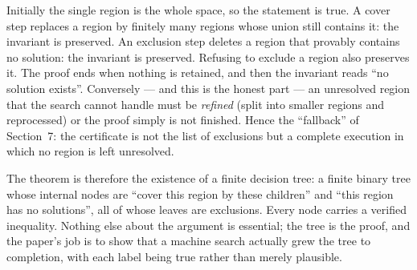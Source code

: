 \documentclass[11pt]{article}
\theoremstyle{definition}
\theoremstyle{plain}
\theoremstyle{definition}
\begin{document}
Initially the single region is the whole space, so the statement is true. A cover step replaces a
region by finitely many regions whose union still contains it: the invariant is preserved. An
exclusion step deletes a region that provably contains no solution: the invariant is preserved.
Refusing to exclude a region also preserves it. The proof ends when nothing is retained, and then
the invariant reads ``no solution exists''. Conversely --- and this is the honest part --- an
unresolved region that the search cannot handle must be \emph{refined} (split into smaller regions
and reprocessed) or the proof simply is not finished. Hence the ``fallback'' of Section~7: the
certificate is not the list of exclusions but a complete execution in which no region is left
unresolved.

\begin{ideabox}
The theorem is therefore the existence of a finite decision tree: a finite binary tree whose
internal nodes are ``cover this region by these children'' and ``this region has no solutions'', all
of whose leaves are exclusions. Every node carries a verified inequality. Nothing else about the
argument is essential; the tree is the proof, and the paper's job is to show that a machine search
actually grew the tree to completion, with each label being true rather than merely plausible.
\end{ideabox}
\end{document}
